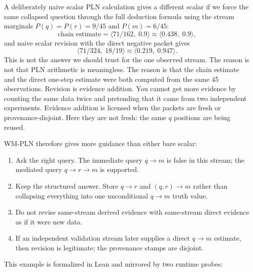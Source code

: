 \documentclass[11pt,openany]{report}
\begin{document}
\begin{example}
A deliberately naive scalar PLN calculation gives a different scalar
if we force the same collapsed question through the full deduction
formula using the
stream marginals $P(q)=P(r)=9/45$ and $P(m)=6/45$:
\[
  \text{chain estimate} =
  \langle 71/162,\;0.9\rangle
  \approx \langle 0.438,\;0.9\rangle,
\]
and naive scalar revision with the direct negative packet gives
\[
  \langle 71/324,\;18/19\rangle
  \approx \langle 0.219,\;0.947\rangle.
\]
This is not the answer we should trust for the one observed stream.
The reason is not that PLN arithmetic is meaningless.  The reason is
that the chain estimate and the direct one-step estimate were both
computed from the same 45 observations.  Revision is evidence
addition.  You cannot get more evidence by counting the same data
twice and pretending that it came from two independent experiments.
Evidence addition is licensed when the packets are fresh or
provenance-disjoint.  Here they are not fresh: the same $q$ positions
are being reused.

WM-PLN therefore gives more guidance than either bare scalar:
\begin{enumerate}
\item Ask the right query.  The immediate query $q \to m$ is false in
  this stream; the mediated query $q \to r \to m$ is supported.
\item Keep the structured answer.  Store $q \to r$ and
  $(q,r)\to m$ rather than collapsing everything into one
  unconditional $q \to m$ truth value.
\item Do not revise same-stream derived evidence with same-stream
  direct evidence as if it were new data.
\item If an independent validation stream later supplies a direct
  $q \to m$ estimate, then revision is legitimate; the provenance
  stamps are disjoint.
\end{enumerate}

\noindent
This example is formalized in Lean and mirrored by two runtime probes:
\begin{flushleft}
\footnotesize
{}\\
\\
\end{flushleft}
\end{example}


\end{document}
